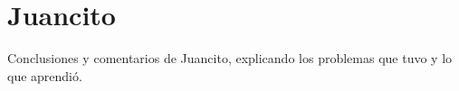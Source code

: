 \section{Juancito}
Conclusiones y comentarios de Juancito, explicando los problemas que tuvo y lo que aprendió.